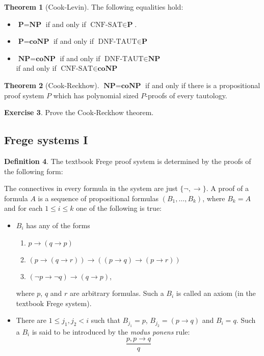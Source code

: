 \documentclass{article}
\theoremstyle{definition}
\newtheorem{thrm}{Theorem}
\newtheorem{excs}[thrm]{Exercise}
\newtheorem{defi}[thrm]{Definition}
\renewcommand{\P}{\textbf{P}}
\newcommand{\NP}{\textbf{NP}}
\newcommand{\coNP}{\textbf{coNP}}
\begin{document}
\begin{thrm}[Cook-Levin]
    The following equalities hold:

    \begin{itemize}
        \item $\P=\NP$ if and only if $\text{CNF-SAT}\in \P$.
        \item $\P=\coNP$ if and only if $\text{DNF-TAUT} \in \P$
        \item $\NP=\coNP$ if and only if $\text{DNF-TAUT} \in \NP$ \\
        if and only if $\text{CNF-SAT}\in \coNP$
    \end{itemize}
\end{thrm}


\begin{thrm}[Cook-Reckhow]
    $\NP=\coNP$ if and only if there is a propositional proof system $P$ which has polynomial sized $P$-proofs of every tautology.
\end{thrm}

\begin{excs}
    Prove the Cook-Reckhow theorem.
\end{excs}

\subsection*{Frege systems I}

\begin{defi}
    The textbook Frege proof system is determined by the proofs of the following form:

    The connectives in every formula in the system are just $\{\lnot, \to \}$. A proof of a formula $A$ is a sequence of propositional formulas $(B_1,\dots, B_k)$, where $B_k=A$ and for each $1 \leq i \leq k$ one of the following is true:
    \begin{itemize}
        \item $B_i$ has any of the forms
        \begin{enumerate}
            \item $p \to (q \to p)$
            \item $(p \to (q\to r))\to((p\to q)\to (p \to r))$
            \item $(\lnot p \to \lnot q)\to (q \to p)$,
        \end{enumerate}
        where $p$, $q$ and $r$ are arbitrary formulas. Such a $B_i$ is called an axiom (in the textbook Frege system).
        \item There are $1\leq j_1, j_2 < i$ such that $B_{j_1}=p$, $B_{j_2}=(p\to q)$ and $B_i=q$. Such a $B_i$ is said to be introduced by the \emph{modus ponens} rule: \[\frac{p, p\to q}{q}\]
    \end{itemize}

\end{defi}
\end{document}
